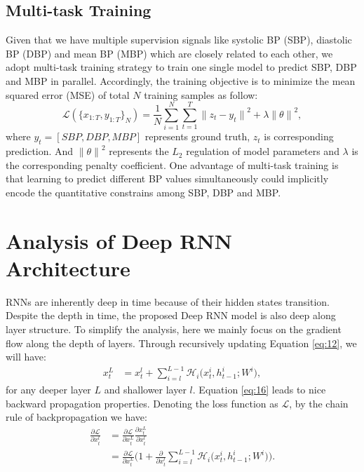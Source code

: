 \documentclass[letterpaper, 10 pt, conference]{ieeeconf}
\begin{document}
\subsection{Multi-task Training}
Given that we have multiple supervision signals like systolic BP (SBP), diastolic BP (DBP) and mean BP (MBP) which are closely related to each other,
we adopt multi-task training strategy to train one single model to predict SBP, DBP and MBP in parallel. 
Accordingly, the training objective is to minimize the mean squared error (MSE) of total $ N $ training samples as follow:
\begin{equation}
\mathcal{L} ( \{x_{1:T}  ,y_{1:T}\}_N )
	 =  \dfrac{1}{N} \sum_{i=1}^{N} \sum_{t=1}^{T}  {\lVert z_t -y_t \rVert}^2 + \lambda{\lVert  \theta \rVert}^2 \label{eq:15}  ,
\end{equation}
where $y_t=[SBP, DBP, MBP] $ represents ground truth, $ z_t$ is corresponding prediction.
And $ {\lVert  \theta \rVert}^2 $ represents the $ L_2 $ regulation of model parameters and $\lambda  $ is the corresponding penalty coefficient.
One advantage of multi-task training is that learning to predict different BP values simultaneously could implicitly encode the quantitative constrains among SBP, DBP and MBP.

\section{Analysis of Deep RNN Architecture} \label{sec:analysis}
RNNs are inherently deep in time because of their hidden states transition.
Despite the depth in time, the proposed Deep RNN model is also deep along layer structure.
To simplify the analysis, here we mainly focus on the gradient flow along the depth of layers.
Through recursively updating Equation \ref{eq:12}, we will have:
\begin{align}
x_t^{L} & = x_t^{l} + \sum_{i=l}^{L-1} \mathcal{H}_{i} \big( x_{t}^{i},  h_{t-1}^{i};  W^{i} \big)   \label{eq:16} ,
\end{align}
for any deeper layer $ L $ and shallower layer  $ l $.
Equation \ref{eq:16} leads to nice backward propagation properties.
Denoting the loss function as $\mathcal{L}  $, by the chain rule of backpropagation we have:
\begin{align}
\frac{\partial \mathcal{L}}{\partial x_t^{l}} &= \frac{\partial \mathcal{L}}{\partial x_t^{L}} \frac{\partial x_t^{L}}{\partial x_t^{l}}  \nonumber \\
& = \frac{\partial \mathcal{L}}{\partial x_t^{L}} \big( 1 + \frac{\partial}{\partial x_t^{l}} \sum_{i=l}^{L-1} \mathcal{H}_{i} \big( x_{t}^{i},  h_{t-1}^{i};  W^{i} \big)  \big).  \label{eq:17}
\end{align}
\end{document}
